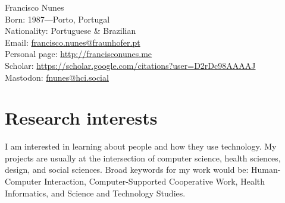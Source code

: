 \documentclass[11pt, a4paper]{article} %
\begin{document}

{\LARGE Francisco Nunes}\\[1cm] %
Born: 1987---Porto, Portugal\\ %
Nationality: Portuguese \& Brazilian \\%

Email: \href{mailto:francisco.nunes@fraunhofer.pt}{francisco.nunes@fraunhofer.pt}\\ %
Personal page: \href{http://francisconunes.me}{http://francisconunes.me}\\
Scholar: \href{https://scholar.google.com/citations?user=D2rDc98AAAAJ}{https://scholar.google.com/citations?user=D2rDc98AAAAJ}\\
Mastodon: \href{https://hci.social/@fnunes}{fnunes@hci.social}









\section*{Research interests}
I am interested in learning about people and how they use technology. My projects are usually at the intersection of computer science, health sciences, design, and social sciences. Broad keywords for my work would be: Human-Computer Interaction, Computer-Supported Cooperative Work, Health Informatics, and Science and Technology Studies.
\end{document}

